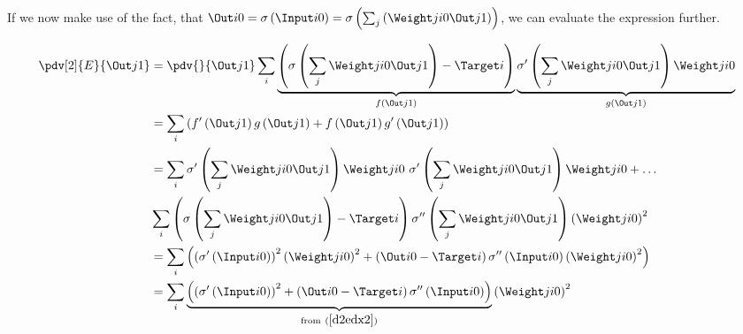 If we now make use of the fact, that 
${\Out i 0} = \sigma\left({\Input i 0}\right) = \sigma\left(\sum_j\left({\Weight j i 0}{\Out j 1}\right)\right)$, we can evaluate the expression further.

\begin{align}
\pdv[2]{E}{{\Out j 1}}
&= \pdv{}{\Out j 1}
\sum_i
\underbrace{\left(\sigma\left(\sum_j{\Weight j i 0}{\Out j 1}\right) - \Target i\right)}
_{f\left(\Out j 1\right)}
\underbrace{\sigma^{\prime}\left(\sum_j{\Weight j i 0}{\Out j 1}\right)\Weight j i 0}
_{g\left(\Out j 1\right)}
\\
&=\sum_i\left(f^{\prime}\left(\Out j 1\right)g\left(\Out j 1\right) + f\left(\Out j 1\right)g^{\prime}\left(\Out j 1\right)\right)
\\
&=\sum_i
\sigma^{\prime}\left(\sum_j{\Weight j i 0}{\Out j 1}\right)\Weight j i 0 \
\sigma^{\prime}\left(\sum_j{\Weight j i 0}{\Out j 1}\right)\Weight j i 0
+ \ldots \\
&\sum_i
\left(\sigma\left(\sum_j{\Weight j i 0}{\Out j 1}\right) - \Target i\right)
\sigma^{\prime\prime}\left(\sum_j{\Weight j i 0}{\Out j 1}\right)\left(\Weight j i 0\right)^2
\\
&=
\sum_i\left(
\left(\sigma^{\prime}\left(\Input i 0\right)\right)^2\left({\Weight j i 0}\right)^2
+ 
\left(\Out i 0 - \Target i\right)
\sigma^{\prime\prime}\left(\Input i 0\right)\left({\Weight j i 0}\right)^2
\right)
\\
&=\sum_i
\underbrace{\left(\left(\sigma^{\prime}\left(\Input i 0\right)\right)^2
+ 
\left(\Out i 0 - \Target i\right)
\sigma^{\prime\prime}\left(\Input i 0\right)\right)}
_{\text{from} \ (\ref{d2edx2})}
\left({\Weight j i 0}\right)^2
\end{align}

